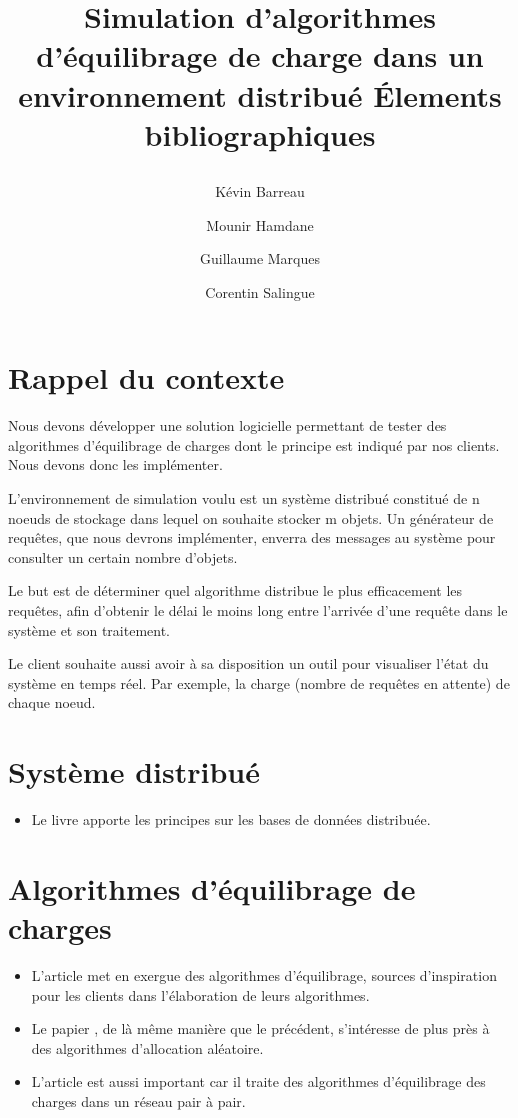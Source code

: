 \documentclass[12 pt]{article}
\title{
 \begin{minipage}\linewidth
        \centering
        Simulation d'algorithmes d'équilibrage de charge dans un environnement distribué 
        \vskip3pt
        \large Élements bibliographiques
    \end{minipage}
    }
\author{Kévin Barreau \and Mounir Hamdane \and Guillaume Marques \and Corentin Salingue}
\begin{document}
\maketitle
\section*{Rappel du contexte}

Nous devons développer une solution logicielle permettant de tester des algorithmes d’équilibrage de charges dont le principe est indiqué par nos clients. Nous devons donc les implémenter.

L’environnement de simulation voulu est un système distribué constitué de n noeuds de stockage dans lequel on souhaite stocker m objets. Un générateur de requêtes, que nous devrons implémenter, enverra des messages au système pour consulter un certain nombre d’objets.

Le but est de déterminer quel algorithme distribue le plus efficacement les requêtes, afin d’obtenir le délai le moins long entre l’arrivée d’une requête dans le système et son traitement.

Le client souhaite aussi avoir à sa disposition un outil pour visualiser l’état du système en temps réel. Par exemple, la charge (nombre de requêtes en attente) de chaque noeud.
  



\section{Système distribué}

\begin{itemize}
\item Le livre \cite{Ozsu2011} apporte les principes sur les bases de données distribuée.

\end{itemize}

\section{Algorithmes d'équilibrage de charges}



\begin{itemize}
\item L'article \cite{BalancedAlloc99} met en exergue des algorithmes d'équilibrage, sources d'inspiration pour les clients dans l'élaboration de leurs algorithmes.

\item Le papier \cite{RandomChoices05}, de là même manière que le précédent, s'intéresse de plus près à des algorithmes d'allocation aléatoire.

\item L'article \cite{LoadBalancingPeertoPeer14} est aussi important car il traite des algorithmes d'équilibrage des charges dans un réseau pair à pair.

\end{itemize}
\end{document}
